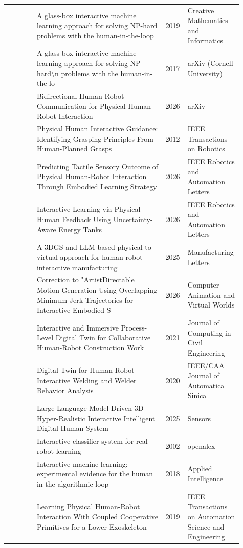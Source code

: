 \documentclass{article}
\begin{document}
\begin{center}
\begin{longtable}{p{0.12\linewidth}p{0.53\linewidth}p{0.08\linewidth}p{0.18\linewidth}}
\citep{pool85_07} & A glass-box interactive machine learning approach for solving NP-hard problems with the human-in-the-loop & 2019 & Creative Mathematics and Informatics\\
\citep{pool85_08} & A glass-box interactive machine learning approach for solving NP-hard\textbackslash{}n problems with the human-in-the-lo & 2017 & arXiv (Cornell University)\\
\citep{pool85_09} & Bidirectional Human-Robot Communication for Physical Human-Robot Interaction & 2026 & arXiv\\
\citep{pool85_10} & Physical Human Interactive Guidance: Identifying Grasping Principles From Human-Planned Grasps & 2012 & IEEE Transactions on Robotics\\
\citep{pool85_11} & Predicting Tactile Sensory Outcome of Physical Human-Robot Interaction Through Embodied Learning Strategy & 2026 & IEEE Robotics and Automation Letters\\
\citep{pool85_12} & Interactive Learning via Physical Human Feedback Using Uncertainty-Aware Energy Tanks & 2026 & IEEE Robotics and Automation Letters\\
\citep{pool85_13} & A 3DGS and LLM-based physical-to-virtual approach for human-robot interactive manufacturing & 2025 & Manufacturing Letters\\
\citep{pool85_14} & Correction to "ArtistDirectable Motion Generation Using Overlapping Minimum Jerk Trajectories for Interactive Embodied S & 2026 & Computer Animation and Virtual Worlds\\
\citep{pool85_15} & Interactive and Immersive Process-Level Digital Twin for Collaborative Human-Robot Construction Work & 2021 & Journal of Computing in Civil Engineering\\
\citep{pool85_16} & Digital Twin for Human-Robot Interactive Welding and Welder Behavior Analysis & 2020 & IEEE/CAA Journal of Automatica Sinica\\
\citep{pool85_17} & Large Language Model-Driven 3D Hyper-Realistic Interactive Intelligent Digital Human System & 2025 & Sensors\\
\citep{pool85_18} & Interactive classifier system for real robot learning & 2002 & openalex\\
\citep{pool85_19} & Interactive machine learning: experimental evidence for the human in the algorithmic loop & 2018 & Applied Intelligence\\
\citep{pool85_20} & Learning Physical Human-Robot Interaction With Coupled Cooperative Primitives for a Lower Exoskeleton & 2019 & IEEE Transactions on Automation Science and Engineering\\

\end{longtable}
\end{center}
\end{document}
